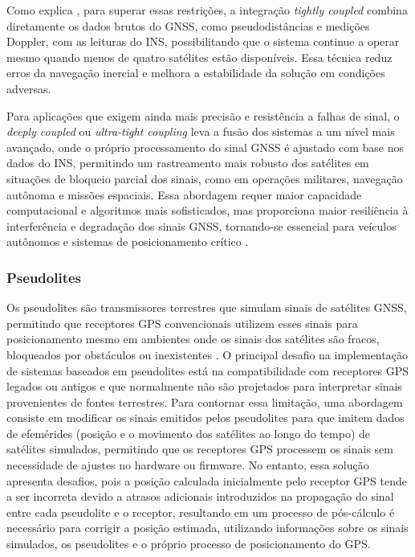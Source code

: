 Como explica \citep{falco2017}, para superar essas restrições, a integração \textit{tightly coupled} combina diretamente os dados brutos do GNSS, como pseudodistâncias e medições Doppler, com as leituras do INS, possibilitando que o sistema continue a operar mesmo quando menos de quatro satélites estão disponíveis. Essa técnica reduz erros da navegação inercial e melhora a estabilidade da solução em condições adversas. 

Para aplicações que exigem ainda mais precisão e resistência a falhas de sinal, o \textit{deeply coupled} ou \textit{ultra-tight coupling} leva a fusão dos sistemas a um nível mais avançado, onde o próprio processamento do sinal GNSS é ajustado com base nos dados do INS, permitindo um rastreamento mais robusto dos satélites em situações de bloqueio parcial dos sinais, como em operações militares, navegação autônoma e missões espaciais. Essa abordagem requer maior capacidade computacional e algoritmos mais sofisticados, mas proporciona maior resiliência à interferência e degradação dos sinais GNSS, tornando-se essencial para veículos autônomos e sistemas de posicionamento crítico \citep{falco2017}. 

\subsubsection{Pseudolites}

Os pseudolites são transmissores terrestres que simulam sinais de satélites GNSS, permitindo que receptores GPS convencionais utilizem esses sinais para posicionamento mesmo em ambientes onde os sinais dos satélites são fracos, bloqueados por obstáculos ou inexistentes \citep{kim2014}. O principal desafio na implementação de sistemas baseados em pseudolites está na compatibilidade com receptores GPS legados ou antigos e que normalmente não são projetados para interpretar sinais provenientes de fontes terrestres. Para contornar essa limitação, uma abordagem consiste em modificar os sinais emitidos pelos pseudolites para que imitem dados de efemérides (posição e o movimento dos satélites ao longo do tempo) de satélites simulados, permitindo que os receptores GPS processem os sinais sem necessidade de ajustes no hardware ou firmware.
No entanto, essa solução apresenta desafios, pois a posição calculada inicialmente pelo receptor GPS tende a ser incorreta devido a atrasos adicionais introduzidos na propagação do sinal entre cada pseudolite e o receptor, resultando em um processo de pós-cálculo é necessário para corrigir a posição estimada, utilizando informações sobre os sinais simulados, os pseudolites e o próprio processo de posicionamento do GPS.

